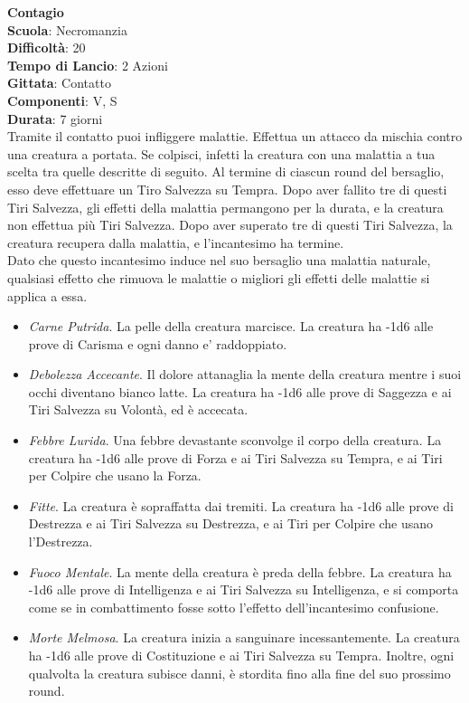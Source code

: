 \begin{multicols}{2}
\medskip\textbf{Contagio}\\
\textbf{Scuola}: Necromanzia\\
\textbf{Difficoltà}:  20\\
\textbf{Tempo di Lancio}: 2 Azioni\\
\textbf{Gittata}: Contatto\\
\textbf{Componenti}: V, S\\
\textbf{Durata}: 7 giorni\\
Tramite il contatto puoi infliggere malattie. Effettua un attacco da mischia contro una creatura a portata. Se colpisci, infetti la creatura con una malattia a tua scelta tra quelle descritte di seguito. Al termine di ciascun round del bersaglio, esso deve effettuare un Tiro Salvezza su Tempra. Dopo aver fallito tre di questi Tiri Salvezza, gli effetti della malattia permangono per la durata, e la creatura non effettua più Tiri Salvezza. Dopo aver superato tre di questi Tiri Salvezza, la creatura recupera dalla malattia, e l'incantesimo ha termine. \\
Dato che questo incantesimo induce nel suo bersaglio una malattia naturale, qualsiasi effetto che rimuova le malattie o migliori gli effetti delle malattie si applica a essa.\\
\begin{itemize}
	\item 
	\textit{Carne Putrida}. La pelle della creatura marcisce. La creatura ha -1d6 alle prove di Carisma e ogni danno e' raddoppiato.
\item 
	\textit{Debolezza Accecante}. Il dolore attanaglia la mente della creatura mentre i suoi occhi diventano bianco latte. La creatura ha -1d6  alle prove di Saggezza e ai Tiri Salvezza su Volontà, ed è accecata.
\item 
   \textit{Febbre Lurida}. Una febbre devastante sconvolge il corpo della creatura. La creatura ha -1d6 alle prove di Forza e ai Tiri Salvezza su Tempra, e ai Tiri per Colpire che usano la Forza.
\item 
\textit{Fitte}. La creatura è sopraffatta dai tremiti. La creatura ha -1d6 alle prove di Destrezza e ai Tiri Salvezza su Destrezza, e ai Tiri per Colpire che usano l'Destrezza.
\item 
\textit{Fuoco Mentale}. La mente della creatura è preda della febbre. La creatura ha -1d6 alle prove di Intelligenza e ai Tiri Salvezza su Intelligenza, e si comporta come se in combattimento fosse sotto l’effetto dell'incantesimo confusione.
\item 
\textit{Morte Melmosa}. La creatura inizia a sanguinare incessantemente. La creatura ha -1d6 alle prove di Costituzione e ai Tiri Salvezza su Tempra. Inoltre, ogni qualvolta la creatura subisce danni, è stordita fino alla fine del suo prossimo round.
\end{itemize}


\end{multicols}
